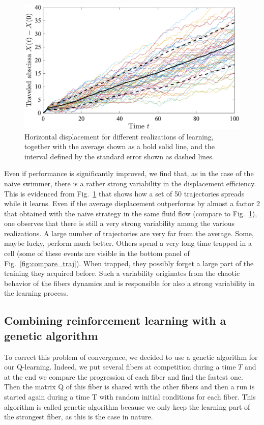 \documentclass[aps,prl,preprint,groupedaddress]{revtex4-2}
\begin{document}
\begin{figure}[ht]
  \centerline{\includegraphics[width=\columnwidth]{travel_learn_diffreal}}
  \caption{\label{fig:travel_learn_diffreal} Horizontal displacement for different realizations of  learning, together with the average shown as a bold solid line, and the interval defined by the standard error shown as dashed lines.}
\end{figure}
Even if performance is significantly improved, we find that, as in the case of the naive swimmer, there is a rather strong variability in the displacement efficiency. This is evidenced from Fig.~\ref{fig:travel_learn_diffreal} that shows how a set of 50 trajectories spreads while it learns. Even if the average displacement outperforms by almost a factor 2 that obtained with the naive strategy in the same fluid flow (compare to Fig.~\ref{fig:travel_learn_diffreal}), one observes that there is still a very strong variability among the various realizations. A large number of trajectories are very far from the average. Some, maybe lucky, perform much better. Others spend a very long time trapped in a cell (some of these events are visible in the bottom panel of Fig.~\ref{fig:compare_traj}). When trapped, they possibly forget a large part of the training they acquired before. Such a variability originates from the chaotic behavior of the fibers dynamics and is responsible for also a strong variability in the learning process.



\subsection{Combining reinforcement learning with a genetic algorithm}

To correct this problem of convergence, we decided to use a genetic algorithm for our Q-learning. Indeed, we put several fibers at competition during a time $T$ and at the end we compare the progression of each fiber and find the fastest one. Then the matrix Q of this fiber is shared with the other fibers and then a run is started again during a time T with random initial conditions for each fiber. This algorithm is called genetic algorithm because we only keep the learning part of the strongest fiber, as this is the case in nature.
\end{document}
